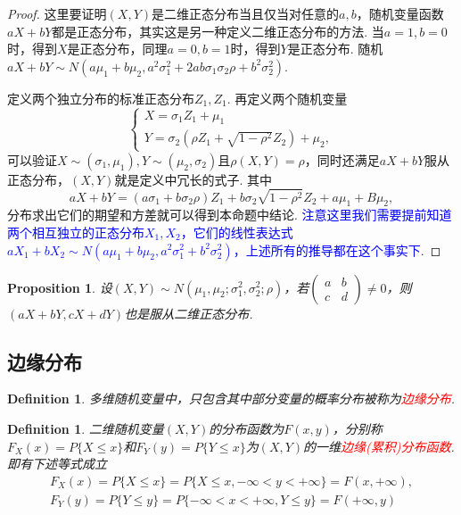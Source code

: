 \documentclass{article}
\newtheorem{proposition}[theorem]{Proposition}
\newtheorem{definition}[theorem]{Definition}
\newcommand{\redt}[1]{\textcolor{red}{#1}}
\newcommand{\bluet}[1]{\textcolor{blue}{#1}}
\begin{document}
\begin{proof}
这里要证明$(X,Y)$是二维正态分布当且仅当对任意的$a,b$，随机变量函数$aX+bY$都是正态分布，其实这是另一种定义二维正态分布的方法. 当$a=1,b=0$时，得到$X$是正态分布，同理$a=0,b=1$时，得到$Y$是正态分布. 随机$aX+bY \sim N(a\mu_1 + b\mu_2, a^2\sigma_1^2+2ab\sigma_1\sigma_2\rho+b^2\sigma_2^2)$. 

定义两个独立分布的标准正态分布$Z_1,Z_1$. 再定义两个随机变量
$$
\left\{
\begin{array}{ll}
X = \sigma_1Z_1 + \mu_1 \\
Y = \sigma_2(\rho Z_1+\sqrt{1-\rho^2}Z_2) + \mu_2,
\end{array} \right.
$$
可以验证$X \sim (\sigma_1, \mu_1),Y \sim (\mu_2,\sigma_2)$且$\rho(X,Y) = \rho$，同时还满足$aX+bY$服从正态分布，$(X,Y)$就是定义中冗长的式子. 其中
$$
aX+bY = (a\sigma_1 + b\sigma_2\rho)Z_1 + b\sigma_2\sqrt{1-\rho^2} Z_2 + a\mu_1 + B\mu_2,
$$
分布求出它们的期望和方差就可以得到本命题中结论. \bluet{注意这里我们需要提前知道两个相互独立的正态分布$X_1,X_2$，它们的线性表达式$aX_1+bX_2 \sim N(a\mu_1+b\mu_2, a^2\sigma_1^2 + b^2\sigma_2^2)$，上述所有的推导都在这个事实下}.
\end{proof}

\begin{proposition}
\rm 设$(X,Y) \sim N(\mu_1,\mu_2;\sigma_1^2,\sigma_2^2; \rho)$，若$\begin{pmatrix}
a & b \\
c & d
\end{pmatrix} \neq 0$，则$(aX+bY,cX+dY)$也是服从二维正态分布. 
\end{proposition}


\subsection{边缘分布}

\begin{definition}
\rm 多维随机变量中，只包含其中部分变量的概率分布被称为\redt{边缘分布}.
\end{definition}

\begin{definition}
\rm 二维随机变量$(X,Y)$的分布函数为$F(x,y)$，分别称$F_X(x)=P\{X \leq x\}$和$F_Y(y) = P\{Y \leq x\}$为$(X,Y)$的一维\redt{边缘(累积)分布函数}. 即有下述等式成立
$$
\begin{array}{ll}
F_X(x) = P\{X \leq x\} = P\{X \leq x,  -\infty < y < +\infty\} = F(x,+\infty),\\
F_Y(y) = P\{Y \leq y\} = P\{-\infty < x < +\infty, Y \leq y\} = F(+\infty,y)
\end{array}
$$
\end{definition}
\end{document}
